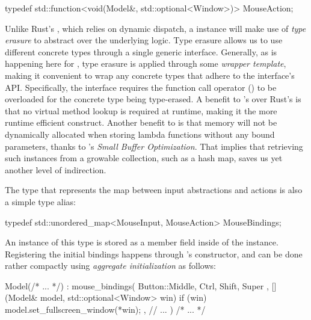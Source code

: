 \begin{cppblock}
  typedef
    std::function<void(Model&, std::optional<Window>)>
    MouseAction;
\end{cppblock}

Unlike Rust's , which relies on dynamic dispatch, a
 instance will make use of \textit{type erasure}
to abstract over the underlying logic\cite{cppstd, typeerasure}. Type
erasure allows us to use different concrete types through a single
generic interface\cite{typeerasure}. Generally, as is happening here for
, type erasure is applied through some \textit{wrapper
template}, making it convenient to wrap any concrete types that adhere to the
interface's API\cite{typeerasure}. Specifically, the 
interface requires the function call operator () to be
overloaded for the concrete type being type-erased\cite{cppstd, typeerasure}.
A benefit to \cpp{}'s  over Rust's  is
that no virtual method lookup is required at runtime, making it the more
runtime efficient construct. Another benefit to  is
that memory will not be dynamically allocated when storing lambda functions
without any bound parameters, thanks to \cpp{}'s \textit{Small Buffer
Optimization}\cite{commonoptimizations, underhoodfunction}. That implies that
retrieving such instances from a growable collection, such as a hash map, saves
us yet another level of indirection.

The  type that represents the map between input
abstractions and actions is also a simple type alias:

\begin{cppblock}
  typedef
    std::unordered_map<MouseInput, MouseAction>
    MouseBindings;
\end{cppblock}

An instance of this type is stored as a member field inside of the 
instance. Registering the initial bindings happens through 's
constructor, and can be done rather compactly using \textit{aggregate
initialization} as follows\cite{stdcpp}:

\begin{cppblock}
  Model(/* ... */)
    : mouse_bindings({
      { { Button::Middle, { Ctrl, Shift, Super } },
        [](Model& model, std::optional<Window> win) {
          if (win) model.set_fullscreen_window(*win);
        }
      },
      // ...
    })
  { /* ... */ }
\end{cppblock}

